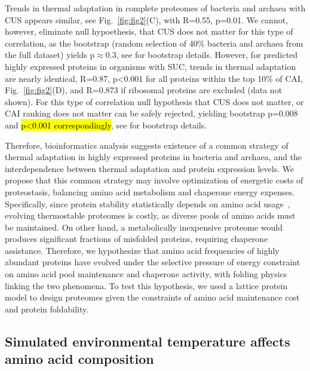 \documentclass[10pt,letterpaper]{article}
\begin{document}
Trends in thermal adaptation in complete proteomes of bacteria and archaea with CUS appears similar, see Fig.~\ref{fig:fig2}(C), with R=0.55, p=0.01. We cannot, however, eliminate null hypoethesis, that CUS does not matter for this type of correlation, as the bootstrap (random selection of 40\% bacteria and archaea from the full dataset) yields p$\approx$0.3, see  for bootstrap details. However, for predicted highly expressed proteins in organisms with SUC, trends in thermal adaptation are nearly identical, R=0.87, p\textless 0.001 for all proteins within the top 10\% of CAI, Fig.~\ref{fig:fig2}(D), and R=0.873 if ribosomal proteins are excluded (data not shown). For this type of correlation null hypothesis that CUS does not matter, or CAI ranking does not matter can be safely rejected, yielding bootstrap p=0.008 and \hl{p<0.001 correspondingly}, see  for bootstrap details.


Therefore, bioinformatics analysis suggests existence of a common strategy of thermal adaptation in highly expressed proteins in bacteria and archaea, and the interdependence between thermal adaptation and protein expression levels. We propose that this common strategy may involve optimization of energetic costs of proteostasis, balancing amino acid metabolism and chaperone energy expenses. Specifically, since protein stability statistically depends on amino acid usage~\cite{Dill1985Theory,Galtier1997Relationships,Zeldovich2007Protein,Venev2015Massively}, evolving thermostable proteomes is costly, as diverse pools of amino acids must be maintained. On other hand, a metabolically inexpensive proteome would produces significant fractions of misfolded proteins, requiring  chaperone assistance. Therefore, we hypothesize that amino acid frequencies of highly abundant proteins have evolved under the selective pressure of energy constraint on amino acid pool maintenance and chaperone activity, with folding physics linking the two phenomena. To test this hypothesis, we used a lattice protein model to design proteomes given the constraints of amino acid maintenance cost and protein foldability.


\subsection*{Simulated environmental temperature affects amino acid composition}
\end{document}
